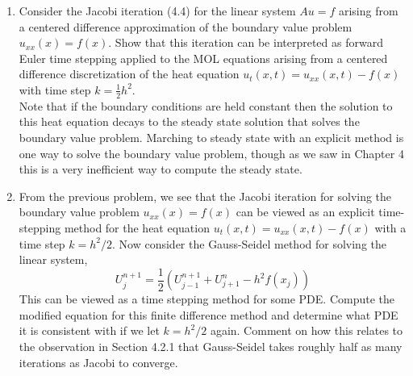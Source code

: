 \documentclass[10pt]{amsart}
\begin{document}
\begin{enumerate}[label={\bf Problem~{\arabic*}:}]
  \mline

  \item Consider the Jacobi iteration (4.4) for the linear system $A u=f$ arising from a centered difference approximation of the boundary value problem $u_{x x}(x)=f(x)$. Show that this iteration can be interpreted as forward Euler time stepping applied to the MOL equations arising from a centered difference discretization of the heat equation $u_{t}(x, t)=u_{x x}(x, t)-f(x)$ with time step $k=\frac{1}{2} h^{2}$.\\
  
Note that if the boundary conditions are held constant then the solution to this heat equation decays to the steady state solution that solves the boundary value problem. Marching to steady state with an explicit method is one way to solve the boundary value problem, though as we saw in Chapter 4 this is a very inefficient way to compute the steady state.
  
  \mline

  \item From the previous problem, we see that the Jacobi iteration for solving the boundary value problem $u_{x x}(x)=f(x)$ can be viewed as an explicit time-stepping method for the heat equation $u_{t}(x, t)=u_{x x}(x, t)-f(x)$ with a time step $k=h^{2} / 2$. Now consider the Gauss-Seidel method for solving the linear system,
$$
U_{j}^{n+1}=\frac{1}{2}\left(U_{j-1}^{n+1}+U_{j+1}^{n}-h^{2} f\left(x_{j}\right)\right)
$$
This can be viewed as a time stepping method for some PDE. Compute the modified equation for this finite difference method and determine what PDE it is consistent with if we let $k=h^{2} / 2$ again. Comment on how this relates to the observation in Section 4.2.1 that Gauss-Seidel takes roughly half as many iterations as Jacobi to converge.
  
  
\end{enumerate}



  
\end{document}
